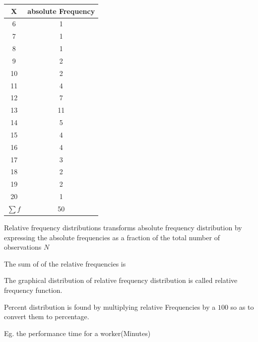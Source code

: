 \documentclass[12pt]{article}
\begin{document}
\begin{table}[H]
    \centering
    \begin{tabular}{|c|c|}
        \hline X        & absolute Frequency \\
        \hline 6        & 1                  \\
        \hline 7        & 1                  \\
        \hline 8        & 1                  \\
        \hline 9        & 2                  \\
        \hline 10       & 2                  \\
        \hline 11       & 4                  \\
        \hline 12       & 7                  \\
        \hline 13       & 11                 \\
        \hline 14       & 5                  \\
        \hline 15       & 4                  \\
        \hline 16       & 4                  \\
        \hline 17       & 3                  \\
        \hline 18       & 2                  \\
        \hline 19       & 2                  \\
        \hline 20       & 1                  \\
        \hline $\sum f$ & 50                 \\

        \hline
    \end{tabular}
\end{table}


Relative frequency distributions transforms absolute frequency distribution by expressing the absolute frequencies as a fraction of the total number of observations $N$

The sum of of the relative frequencies is

The graphical distribution of relative frequency distribution is called relative frequency function.

Percent distribution is found by multiplying relative Frequencies by a $100$ so as to convert them to percentage.

Eg. the performance time for a worker(Minutes)

\end{document}
